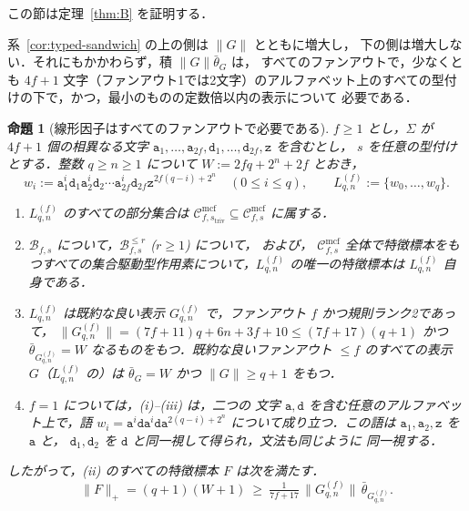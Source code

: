\documentclass[11pt,a4paper]{ltjsarticle}
\numberwithin{equation}{section}
\theoremstyle{plain}
\newtheorem{proposition}[theorem]{命題}
\theoremstyle{definition}
\theoremstyle{remark}
\newcommand{\Cmcf}[2]{\mathcal{C}^{\mathrm{mcf}}_{#1,#2}}
\theoremstyle{plain}
\begin{document}
この節は定理~\ref{thm:B} を証明する．

系~\ref{cor:typed-sandwich} の上の側は $\|G\|$ とともに増大し，
下の側は増大しない．それにもかかわらず，積 $\|G\|\bar\theta_G$ は，
すべてのファンアウトで，少なくとも
$4f+1$ 文字（ファンアウト1では2文字）のアルファベット上のすべての型付けの下で，かつ，最小のものの定数倍以内の表示について
必要である．

\begin{proposition}[線形因子はすべてのファンアウトで必要である]
\label{prop:linear-factor-all-fanout}
$f\ge1$ とし，$\Sigma$ が $4f+1$ 個の相異なる文字
$\mathtt a_1,\ldots,\mathtt a_{2f},\mathtt d_1,\ldots,\mathtt d_{2f},\mathtt z$ を含むとし，
$s$ を任意の型付けとする．整数 $q\ge n\ge1$ について $W:=2fq+2^n+2f$ とおき，
\[
 w_i:=\mathtt a_1^i\mathtt d_1\mathtt a_2^i\mathtt d_2\cdots\mathtt a_{2f}^i\mathtt d_{2f}
 \mathtt z^{2f(q-i)+2^n}\quad(0\le i\le q),\qquad
 L^{(f)}_{q,n}:=\{w_0,\ldots,w_q\}.
\]
\begin{enumerate}[label=\textup{(\roman*)},leftmargin=*]
\item $L^{(f)}_{q,n}$ のすべての部分集合は
$\Cmcf{f}{s_{\mathrm{triv}}}\subseteq\Cmcf{f}{s}$ に属する．
\item $\mathcal B_{f,s}$ について，$\mathcal B^{\le r}_{f,s}$ \textup($r\ge1$\textup) について，
および，
$\Cmcf{f}{s}$ 全体で特徴標本をもつすべての集合駆動型作用素について，$L^{(f)}_{q,n}$ の唯一の特徴標本は
$L^{(f)}_{q,n}$ 自身である．
\item $L^{(f)}_{q,n}$ は既約な良い表示 $G^{(f)}_{q,n}$ で，ファンアウト
$f$ かつ規則ランク2であって，
$\|G^{(f)}_{q,n}\|=(7f+11)q+6n+3f+10\le(7f+17)(q+1)$ かつ
$\bar\theta_{G^{(f)}_{q,n}}=W$ なるものをもつ．既約な良いファンアウト $\le f$ のすべての表示
$G$（$L^{(f)}_{q,n}$ の）は $\bar\theta_G=W$ かつ $\|G\|\ge q+1$ をもつ．
\item $f=1$ については，\textup{(i)}--\textup{(iii)} は，二つの
文字 $\mathtt a,\mathtt d$ を含む任意のアルファベット上で，語
$w_i=\mathtt a^i\mathtt d\mathtt a^i\mathtt d\mathtt a^{2(q-i)+2^n}$ について成り立つ．この語は
$\mathtt a_1,\mathtt a_2,\mathtt z$ を $\mathtt a$ と，
$\mathtt d_1,\mathtt d_2$ を $\mathtt d$ と同一視して得られ，文法も同じように
同一視する．
\end{enumerate}
したがって，\textup{(ii)} のすべての特徴標本 $F$ は次を満たす．
\[
 \|F\|_+=(q+1)(W+1)\ \ge\ \tfrac1{7f+17}\,\|G^{(f)}_{q,n}\|\,
 \bar\theta_{G^{(f)}_{q,n}}.
\]
\end{proposition}
\end{document}
